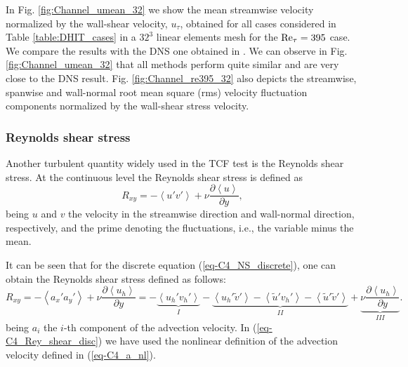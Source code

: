 In Fig. \ref{fig:Channel_umean_32} we show the mean streamwise velocity normalized by the wall-shear velocity, $u_\tau$, obtained for all cases considered in Table \ref{table:DHIT_cases} in a $32^3$ linear elements mesh for the ${\rm Re}_\tau=395$ case. We compare the results with the DNS one obtained in  \cite{moser_direct_1999}. We can observe in Fig. \ref{fig:Channel_umean_32} that all methods perform quite similar and are very close to the DNS result. Fig. \ref{fig:Channel_re395_32} also depicts the streamwise, spanwise and wall-normal root mean square (rms) velocity fluctuation components normalized by the wall-shear stress velocity. 


\subsubsection{Reynolds shear stress}

Another turbulent quantity widely used in the TCF test is the Reynolds shear stress. At the continuous level the Reynolds shear stress is defined as
\begin{equation}
\label{eq-C4_Rey_shear_cont}
R_{xy}=-\left\langle u'v'\right\rangle+\nu\frac{\partial\left\langle u\right\rangle}{\partial y},
\end{equation}
being $u$ and $v$ the velocity in the streamwise direction and wall-normal direction, respectively,
and the prime denoting the fluctuations, i.e., the variable minus the mean.

It can be seen that for the discrete equation (\ref{eq-C4_NS_discrete}), one can obtain the Reynolds shear stress defined as follows:
\begin{equation}
\label{eq-C4_Rey_shear_disc}
R_{xy}=-\left\langle a_x'a_y'\right\rangle+\nu\frac{\partial\left\langle u_h\right\rangle}{\partial y}=-\underbrace{\left\langle u_h'v_h'\right\rangle}_I-\underbrace{\left\langle u_h'\tilde{v}'\right\rangle-\left\langle \tilde{u}'v_h'\right\rangle-\left\langle \tilde{u}'\tilde{v}'\right\rangle}_{II}+\underbrace{\nu\frac{\partial\left\langle u_h\right\rangle}{\partial y}}_{III}.
\end{equation}
being $a_i$ the $i$-th component of the advection velocity. In (\ref{eq-C4_Rey_shear_disc}) we have used the nonlinear definition of the advection velocity defined in (\ref{eq-C4_a_nl}).

